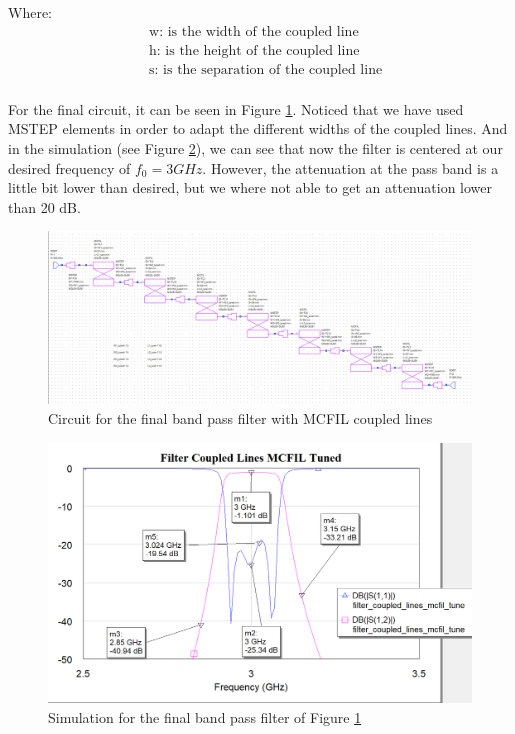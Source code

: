 \documentclass[12pt]{report} %
\begin{document}
Where:
\begin{align*}
    &\text{w: is the width of the coupled line} \\
    &\text{h: is the height of the coupled line} \\
    &\text{s: is the separation of the coupled line} \\
\end{align*}

For the final circuit, it can be seen in Figure \ref{fig:microstrip_elements:filter_coupled_lines_mcfil_tuned_circuit}. Noticed that we have used MSTEP elements in order to adapt the different widths of the coupled lines. And in the simulation (see Figure \ref{fig:microstrip_elements:filter_coupled_lines_mcfil_tuned_graph}), we can see that now the filter is centered at our desired frequency of $f_0 = 3 GHz$. However, the attenuation at the pass band is a little bit lower than desired, but we where not able to get an attenuation lower than 20 dB.

\begin{figure}[htbp]
    \centering
    \includegraphics[width=1\linewidth]{images//microstrip_elements/filter_coupled_lines_mcfil_tuned_circuit.png}
    \caption{Circuit for the final band pass filter with MCFIL coupled lines}
    \label{fig:microstrip_elements:filter_coupled_lines_mcfil_tuned_circuit}
\end{figure}

\begin{figure}[htbp]
    \centering
    \includegraphics[width=1\linewidth]{images//microstrip_elements/filter_coupled_lines_mcfil_tuned_graph.png}
    \caption{Simulation for the final band pass filter of Figure \ref{fig:microstrip_elements:filter_coupled_lines_mcfil_tuned_circuit}}
    \label{fig:microstrip_elements:filter_coupled_lines_mcfil_tuned_graph}
\end{figure}
\end{document}

